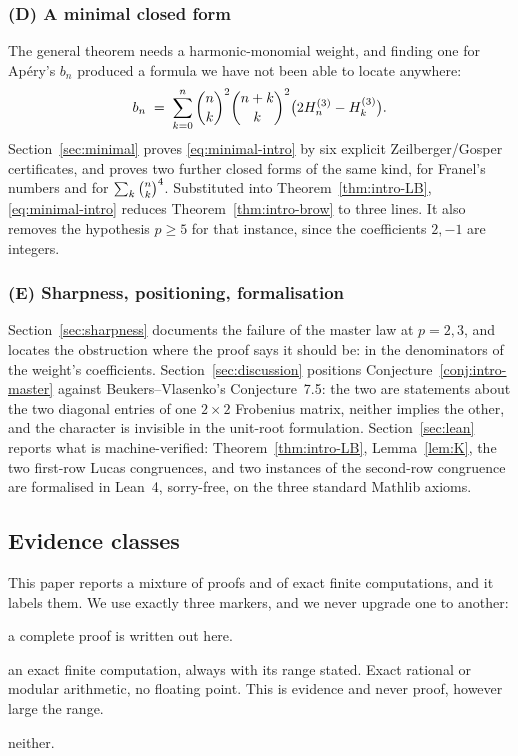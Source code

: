 \subsubsection*{(D) A minimal closed form}
The general theorem needs a harmonic-monomial weight, and finding one for Ap\'ery's $b_n$
produced a formula we have not been able to locate anywhere:
\begin{equation}\label{eq:minimal-intro}
   b_n\;=\;\sum_{k=0}^n\binom{n}{k}^2\binom{n+k}{k}^2\bigl(2H^{(3)}_{n}-H^{(3)}_{k}\bigr).
\end{equation}
Section~\ref{sec:minimal} proves \eqref{eq:minimal-intro} by six explicit
Zeilberger/Gosper certificates, and proves two further closed forms of the same kind, for
Franel's numbers and for $\sum_k\binom{n}{k}^4$. Substituted into Theorem~\ref{thm:intro-LB},
\eqref{eq:minimal-intro} reduces Theorem~\ref{thm:intro-brow} to three lines. It also
removes the hypothesis $p\ge5$ for that instance, since the coefficients $2,-1$ are
integers.

\subsubsection*{(E) Sharpness, positioning, formalisation}
Section~\ref{sec:sharpness} documents the failure of the master law at $p=2,3$, and
locates the obstruction where the proof says it should be: in the denominators of the
weight's coefficients. Section~\ref{sec:discussion} positions
Conjecture~\ref{conj:intro-master} against Beukers--Vlasenko's Conjecture~7.5: the two are
statements about the two diagonal entries of one $2\times2$ Frobenius matrix, neither
implies the other, and the character is invisible in the unit-root formulation.
Section~\ref{sec:lean} reports what is machine-verified: Theorem~\ref{thm:intro-LB},
Lemma~\ref{lem:K}, the two first-row Lucas congruences, and two instances of the
second-row congruence are formalised in Lean~4, sorry-free, on the three standard Mathlib
axioms.

\subsection{Evidence classes}
\label{ssec:evidence}

This paper reports a mixture of proofs and of exact finite computations, and it labels
them. We use exactly three markers, and we never upgrade one to another:

\begin{description}[leftmargin=2.2em,style=nextline]
\item[\Proved] a complete proof is written out here.
\item[\Verified] an exact finite computation, always with its range stated. Exact rational
  or modular arithmetic, no floating point. This is evidence and never proof, however
  large the range.
\item[\Open] neither.
\end{description}

